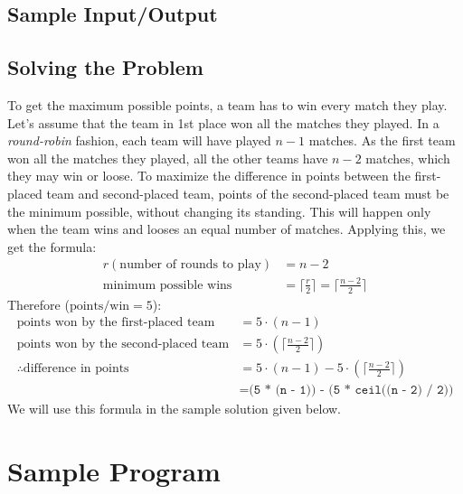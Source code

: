 \documentclass[12pt]{report}
\begin{document}
    \subsection*{Sample Input/Output}

    \subsection*{Solving the Problem}
    To get the maximum possible points, a team has to win every match they play. Let's assume that the team in 1st place won all the matches they played. In a \textit{round-robin} fashion, each team will have played $n-1$ matches. As the first team won all the matches they played, all the other teams have $n-2$ matches, which they may win or loose. To maximize the difference in points between the first-placed team and second-placed team, points of the second-placed team must be the minimum possible, without changing its standing. This will happen only when the team wins and looses an equal number of matches. Applying this, we get the formula:
    \begin{align*}
    r (\text{number of rounds to play}) &= n-2 \\
    \text{minimum possible wins} &= \lceil\frac{r}{2}\rceil = \lceil\frac{n-2}{2}\rceil
    \end{align*}
    Therefore ($\text{points/win}=5$):
    \begin{align*}
      \text{points won by the first-placed team} &= 5\cdot(n-1) \\
      \text{points won by the second-placed team} &= 5\cdot(\lceil\frac{n-2}{2}\rceil)\\
      \therefore\text{difference in points} &= 5\cdot(n-1) - 5\cdot(\lceil\frac{n-2}{2}\rceil)\\
      &= \texttt{(5 * (n - 1)) - (5 * ceil((n - 2) / 2))}
    \end{align*}
    We will use this formula in the sample solution given below.

	\section*{Sample Program}
	
	
\end{document}
